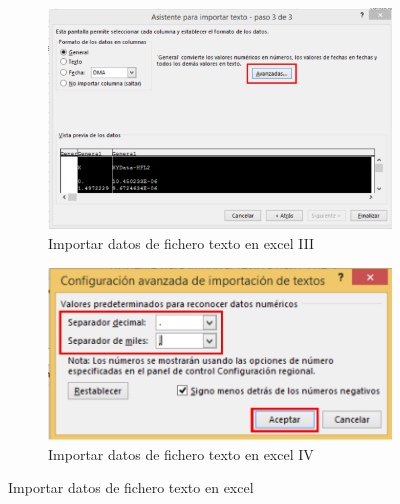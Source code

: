 \begin{itemize}
\begin{figure}[!h]
    \begin{subfigure}[!h]{0.50\textwidth}
      \includegraphics[width=\textwidth]{./body/images/post24.pdf}
      \caption{Importar datos de fichero texto en excel III}
      \label{post24}
    \end{subfigure}%
    \begin{subfigure}[!h]{0.50\textwidth}
      \includegraphics[width=\textwidth]{./body/images/post25.pdf}
      \caption{Importar datos de fichero texto en excel IV}
      \label{post25}
    \end{subfigure}%
    \caption{Importar datos de fichero texto en excel}
  \end{figure}


\end{itemize}
